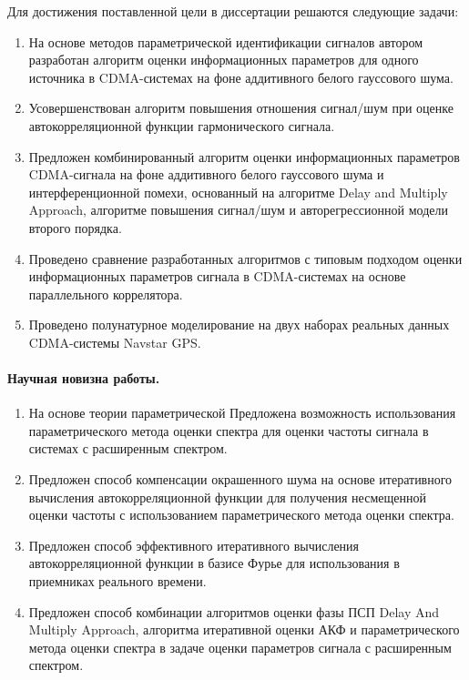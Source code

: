 Для достижения поставленной цели в диссертации решаются следующие задачи:
\begin{enumerate}
	\item {На основе методов параметрической идентификации сигналов автором разработан алгоритм оценки информационных параметров для одного источника
		в CDMA-системах на фоне аддитивного белого гауссового шума.}
	\item {Усовершенствован алгоритм повышения отношения сигнал/шум при оценке автокорреляционной функции гармонического сигнала.}
	\item {Предложен комбинированный алгоритм оценки информационных параметров CDMA-сигнала на фоне аддитивного белого гауссового шума и
		интерференционной помехи, основанный на алгоритме Delay and Multiply Approach, алгоритме повышения сигнал/шум и авторегрессионной модели второго порядка.}
	\item {Проведено сравнение разработанных алгоритмов с типовым подходом оценки информационных параметров сигнала в CDMA-системах на основе параллельного коррелятора.}
	\item {Проведено полунатурное моделирование на двух наборах реальных данных CDMA-системы Navstar GPS.}
\end{enumerate}

\paragraph{Научная новизна работы.}
\begin{enumerate}
	\item{На основе теории параметрической Предложена возможность использования параметрического метода оценки спектра для оценки частоты сигнала в системах с расширенным спектром.}
	\item{Предложен способ компенсации окрашенного шума на основе итеративного вычисления автокорреляционной функции для
		получения несмещенной оценки частоты с использованием параметрического метода оценки спектра.}
	\item{Предложен способ эффективного итеративного вычисления автокорреляционной функции в базисе Фурье для использования в
		приемниках реального времени.}
	\item{Предложен способ комбинации алгоритмов оценки фазы ПСП Delay And Multiply Approach, алгоритма итеративной оценки АКФ и
		параметрического метода оценки спектра в задаче оценки параметров сигнала с расширенным спектром.}
\end{enumerate}

